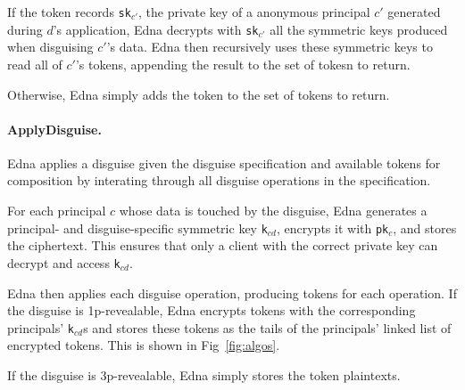 If the token records \texttt{sk}$_{c'}$, the private key of a
anonymous principal $c'$ generated during $d$'s application, Edna decrypts with \texttt{sk}$_{c'}$
all the symmetric keys produced when disguising $c'$'s data. Edna then recursively uses these
symmetric keys to read all of $c'$'s tokens, appending the result to the set of tokesn to
return.

Otherwise, Edna simply adds the token to the set of tokens to return. 

\paragraph{ApplyDisguise.} Edna applies a disguise given the disguise specification and available tokens
for composition by interating through all disguise operations in the specification.

For each principal $c$ whose data is touched by the disguise, Edna generates a principal- and disguise-specific symmetric key \texttt{k}$_{cd}$, encrypts it with \texttt{pk}$_c$, and stores the ciphertext. This ensures that only a client with the correct private key can decrypt and access
\texttt{k}$_{cd}$. 

Edna then applies each disguise operation, producing tokens for each operation. If the disguise is
1p-revealable, Edna encrypts tokens with the corresponding principals' \texttt{k}$_{cd}$s and stores
these tokens as the tails of the principals' linked list of
encrypted tokens. This is shown in Fig~\ref{fig:algos}.

If the disguise is 3p-revealable, Edna simply stores the token plaintexts.


